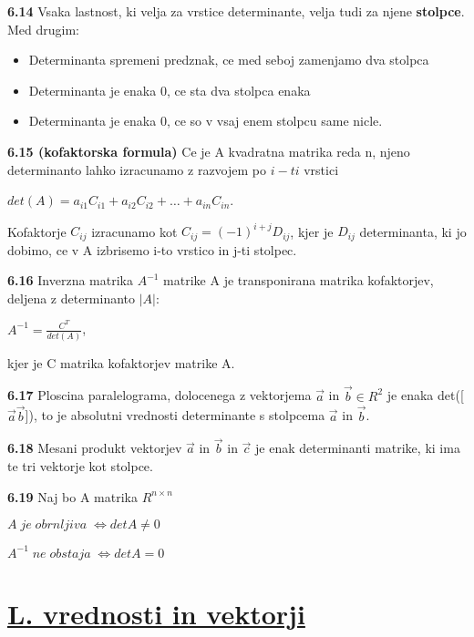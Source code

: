 \documentclass{article}
\begin{document}
\begin{multicols}{4}
	\textbf{6.14} Vsaka lastnost, ki velja za vrstice determinante, velja tudi
	za njene \textbf{stolpce}. Med drugim:
	\begin{itemize}
		\item Determinanta spremeni predznak, ce med seboj zamenjamo dva stolpca
		\item Determinanta je enaka 0, ce sta dva stolpca enaka
		\item Determinanta je enaka 0, ce so v vsaj enem stolpcu same nicle.
	\end{itemize}

	\textbf{6.15 (kofaktorska formula)} Ce je A kvadratna matrika reda n,
	njeno determinanto lahko izracunamo z razvojem po $i-ti$ vrstici
	\begin{center}
		$det(A) = a_{i1}C_{i1} + a_{i2}C_{i2} + \hdots + a_{in}C_{in}$.
	\end{center}
	Kofaktorje $C_{ij}$ izracunamo kot $C_{ij} = (-1)^{i+j}D_{ij}$, kjer je $D_{ij}$ determinanta,
	ki jo dobimo, ce v A izbrisemo i-to vrstico in j-ti stolpec.

	\textbf{6.16} Inverzna matrika $A^{-1}$ matrike A je transponirana matrika kofaktorjev,
	deljena z determinanto $|A|$:
	\begin{center}
		$A^{-1} = \frac{C^{T}}{det(A)}$,
	\end{center}
	kjer je C matrika kofaktorjev matrike A.

	\textbf{6.17} Ploscina paralelograma, dolocenega z vektorjema $\vec{a}$ in $\vec{b} \in R^{2}$ je
	enaka det([$\vec{a} \vec{b}$]), to je absolutni vrednosti determinante s stolpcema $\vec{a}$ in $\vec{b}$.

	\textbf{6.18} Mesani produkt vektorjev $\vec{a}$ in $\vec{b}$ in $\vec{c}$ je enak determinanti matrike, ki
	ima te tri vektorje kot stolpce.

	\textbf{6.19} Naj bo A matrika $R^{n\times n}$
	\begin{center}
		\begin{math}
			A\; je\; obrnljiva\; \iff detA \neq 0
		\end{math}
	\end{center}
	\begin{center}
		\begin{math}
			A^{-1}\; ne\; obstaja\; \iff detA = 0
		\end{math}
	\end{center}

	\section{\underline{L. vrednosti in vektorji}}


\end{multicols}
\end{document}
